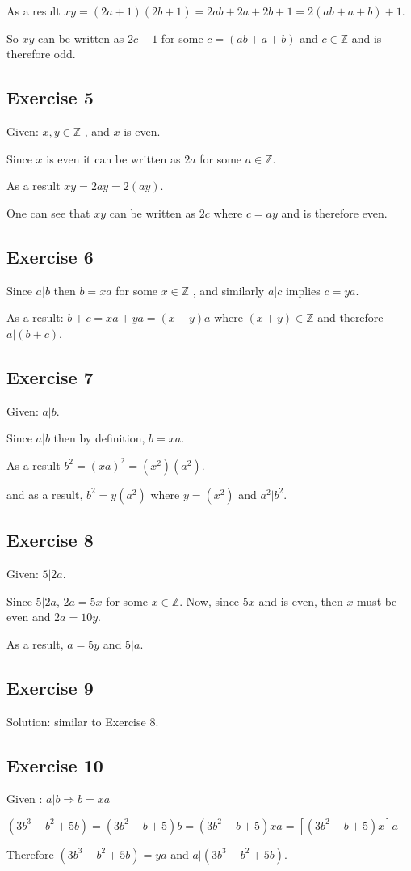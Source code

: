 \documentclass[a4paper]{article}
\begin{document}
As a result $xy = (2a+1)(2b+1) = 2ab + 2a + 2b + 1 = 2(ab+a+b)+1$.

So $xy$ can be written as $2c+1$ for some $c=(ab+a+b)$ and $c \in \mathbb{Z}$
and is therefore odd.

\subsection{Exercise 5}

Given: $ x, y \in \mathbb{Z} $ , and $x$ is even.

Since $x$ is even it can be written as $2a$ for some $a \in \mathbb{Z}$.

As a result $xy = 2ay = 2(ay)$.

One can see that $xy$ can be written as $2c$ where $c = ay$ and is therefore
even.

\subsection{Exercise 6}

Since $a | b$ then $b = xa$ for some $x \in \mathbb{Z}$ , and similarly $a | c$
implies $c = ya$.

As a result: $b+c = xa + ya = (x+y)a$ where $ (x+y) \in \mathbb{Z}$ and
therefore $a|(b+c)$.

\subsection{Exercise 7}

Given: $a | b$.

Since $a | b$ then by definition, $b = xa$.

As a result $b^2 = (xa)^2 = (x^2)(a^2)$.

and as a result, $b^2 = y(a^2)$ where $y=(x^2)$ and $a^2|b^2$.

\subsection{Exercise 8}

Given: $5 | 2a$.

Since $5 | 2a$, $2a = 5x$ for some $x \in \mathbb{Z} $. Now, since $5x$
and is even, then $x$ must be even and $2a = 10y$.

As a result, $a = 5y$ and $5 | a$.

\subsection{Exercise 9}

Solution: similar to Exercise 8.

\subsection{Exercise 10}

Given : $a|b \Rightarrow b = xa$

$ (3b^3 - b^2 + 5b) = (3b^2 - b + 5)b = (3b^2 - b + 5)xa =
\left[(3b^2 - b + 5)x\right]a$

Therefore $(3b^3 - b^2 + 5b) = ya$ and $a|(3b^3 - b^2 + 5b)$.
\end{document}
